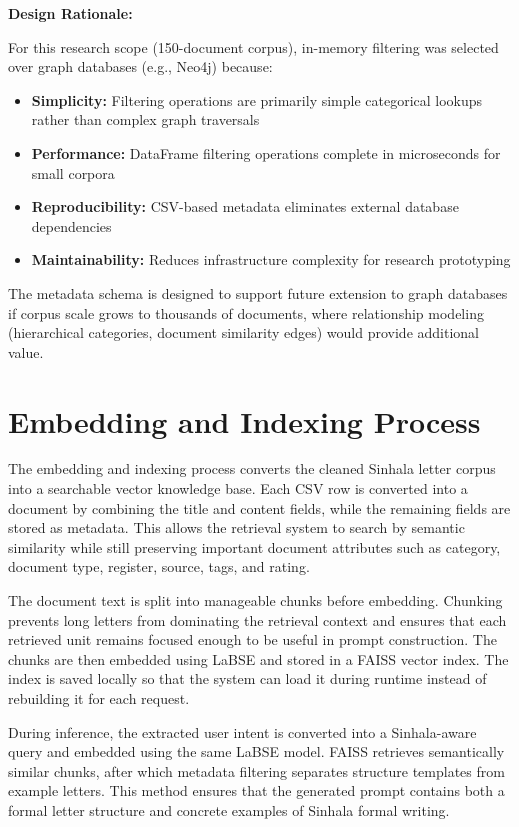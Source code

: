 \documentclass[12pt]{uomthesis}
\begin{document}
\textbf{Design Rationale:}

For this research scope (150-document corpus), in-memory filtering was selected over graph databases (e.g., Neo4j) because:

\begin{itemize}
    \item \textbf{Simplicity:} Filtering operations are primarily simple categorical lookups rather than complex graph traversals
    \item \textbf{Performance:} DataFrame filtering operations complete in microseconds for small corpora
    \item \textbf{Reproducibility:} CSV-based metadata eliminates external database dependencies
    \item \textbf{Maintainability:} Reduces infrastructure complexity for research prototyping
\end{itemize}

The metadata schema is designed to support future extension to graph databases if corpus scale grows to thousands of documents, where relationship modeling (hierarchical categories, document similarity edges) would provide additional value.

\section{Embedding and Indexing Process}
The embedding and indexing process converts the cleaned Sinhala letter corpus into a searchable vector knowledge base. Each CSV row is converted into a document by combining the title and content fields, while the remaining fields are stored as metadata. This allows the retrieval system to search by semantic similarity while still preserving important document attributes such as category, document type, register, source, tags, and rating.

The document text is split into manageable chunks before embedding. Chunking prevents long letters from dominating the retrieval context and ensures that each retrieved unit remains focused enough to be useful in prompt construction. The chunks are then embedded using LaBSE and stored in a FAISS vector index. The index is saved locally so that the system can load it during runtime instead of rebuilding it for each request.

During inference, the extracted user intent is converted into a Sinhala-aware query and embedded using the same LaBSE model. FAISS retrieves semantically similar chunks, after which metadata filtering separates structure templates from example letters. This method ensures that the generated prompt contains both a formal letter structure and concrete examples of Sinhala formal writing.
\end{document}
